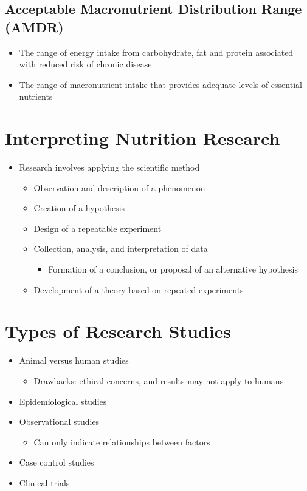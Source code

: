 \documentclass[title={Chapter 1}]{fdsn201notes}
\begin{document}
\subsection{Acceptable Macronutrient Distribution Range (AMDR)}\label{subsec:amdr}
\begin{itemize}
	\item The range of energy intake from carbohydrate, fat and protein associated with reduced risk of chronic disease
	\item The range of macronutrient intake that provides adequate levels of essential nutrients
\end{itemize}

\section{Interpreting Nutrition Research}\label{sec:interpreting-nutrition-research}
\begin{itemize}
	\item Research involves applying the scientific method
	\begin{itemize}
		\item Observation and description of a phenomenon
		\item Creation of a hypothesis
		\item Design of a repeatable experiment
		\item Collection, analysis, and interpretation of data
		\begin{itemize}
			\item Formation of a conclusion, or proposal of an alternative hypothesis
		\end{itemize}
		\item Development of a theory based on repeated experiments
	\end{itemize}
\end{itemize}

\section{Types of Research Studies}\label{sec:types-of-research-studies}
\begin{itemize}
	\item Animal versus human studies
	\begin{itemize}
		\item Drawbacks: ethical concerns, and results may not apply to humans
	\end{itemize}
	\item Epidemiological studies
	\item Observational studies
	\begin{itemize}
		\item Can only indicate relationships between factors
	\end{itemize}
	\item Case control studies
	\item Clinical trials
\end{itemize}
\end{document}
